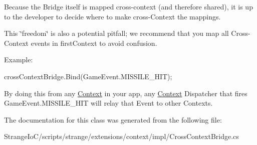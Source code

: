 Because the Bridge itself is mapped cross-\/context (and therefore shared), it is up to the developer to decide where to make cross-\/\-Context the mappings.

This \char`\"{}freedom\char`\"{} is also a potential pitfall; we recommend that you map all Cross-\/\-Context events in first\-Context to avoid confusion.

Example\-:

cross\-Context\-Bridge.\-Bind(Game\-Event.\-M\-I\-S\-S\-I\-L\-E\-\_\-\-H\-I\-T);

By doing this from any \hyperlink{classstrange_1_1extensions_1_1context_1_1impl_1_1_context}{Context} in your app, any \hyperlink{classstrange_1_1extensions_1_1context_1_1impl_1_1_context}{Context} Dispatcher that fires {\ttfamily Game\-Event.\-M\-I\-S\-S\-I\-L\-E\-\_\-\-H\-I\-T} will relay that Event to other Contexts. 

The documentation for this class was generated from the following file\-:\begin{DoxyCompactItemize}
\item 
Strange\-Io\-C/scripts/strange/extensions/context/impl/Cross\-Context\-Bridge.\-cs\end{DoxyCompactItemize}
